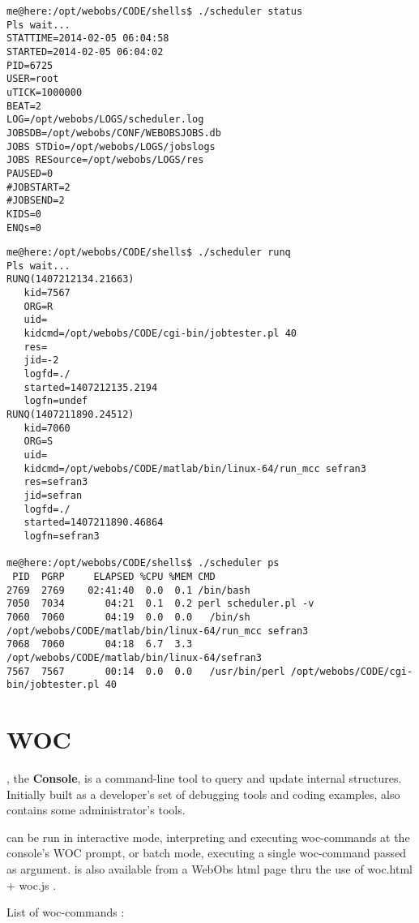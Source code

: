 \begin{lstlisting}[style=console,title=example scheduler status]
me@here:/opt/webobs/CODE/shells$ ./scheduler status
Pls wait...
STATTIME=2014-02-05 06:04:58
STARTED=2014-02-05 06:04:02
PID=6725
USER=root
uTICK=1000000
BEAT=2
LOG=/opt/webobs/LOGS/scheduler.log
JOBSDB=/opt/webobs/CONF/WEBOBSJOBS.db
JOBS STDio=/opt/webobs/LOGS/jobslogs
JOBS RESource=/opt/webobs/LOGS/res
PAUSED=0
#JOBSTART=2
#JOBSEND=2
KIDS=0
ENQs=0
\end{lstlisting}

\begin{lstlisting}[style=console,title=example runq and ps]
me@here:/opt/webobs/CODE/shells$ ./scheduler runq
Pls wait...
RUNQ(1407212134.21663)
   kid=7567
   ORG=R
   uid=
   kidcmd=/opt/webobs/CODE/cgi-bin/jobtester.pl 40 
   res=
   jid=-2
   logfd=./
   started=1407212135.2194
   logfn=undef
RUNQ(1407211890.24512)
   kid=7060
   ORG=S
   uid=
   kidcmd=/opt/webobs/CODE/matlab/bin/linux-64/run_mcc sefran3 
   res=sefran3
   jid=sefran
   logfd=./
   started=1407211890.46864
   logfn=sefran3

me@here:/opt/webobs/CODE/shells$ ./scheduler ps
 PID  PGRP     ELAPSED %CPU %MEM CMD
2769  2769    02:41:40  0.0  0.1 /bin/bash
7050  7034       04:21  0.1  0.2 perl scheduler.pl -v
7060  7060       04:19  0.0  0.0   /bin/sh /opt/webobs/CODE/matlab/bin/linux-64/run_mcc sefran3
7068  7060       04:18  6.7  3.3     /opt/webobs/CODE/matlab/bin/linux-64/sefran3
7567  7567       00:14  0.0  0.0   /usr/bin/perl /opt/webobs/CODE/cgi-bin/jobtester.pl 40
\end{lstlisting}

\section{WOC}

, the \webobs \textbf{Console}, is a command-line tool to query and update internal \webobs structures.
Initially built as a developer's set of debugging tools and coding examples,  also contains some \webobs administrator's tools. 

 can be run in interactive mode, interpreting and executing woc-commands at the console's WOC prompt, or 
batch mode, executing a single woc-command passed as argument.  is also available from a WebObs html page 
thru the use of woc.html + woc.js .

List of woc-commands :

